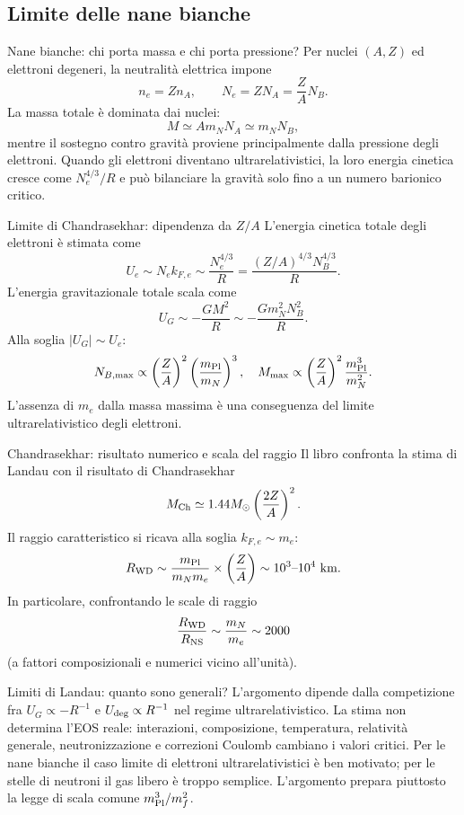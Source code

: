 \subsection{Limite delle nane bianche}

\begin{frame}[t]{Nane bianche: chi porta massa e chi porta pressione?}
\small
Per nuclei $(A,Z)$ ed elettroni degeneri, la neutralità elettrica impone
\[
n_e=Zn_A,\qquad N_e=ZN_A=\frac ZA N_B.
\]
La massa totale è dominata dai nuclei:
\[
M\simeq A m_N N_A\simeq m_NN_B,
\]
mentre il sostegno contro gravità proviene principalmente dalla pressione degli elettroni.
\medskip
Quando gli elettroni diventano ultrarelativistici, la loro energia cinetica cresce come $N_e^{4/3}/R$ e può bilanciare la gravità solo fino a un numero barionico critico.
\end{frame}

\begin{frame}[t]{Limite di Chandrasekhar: dipendenza da $Z/A$}
\small
L'energia cinetica totale degli elettroni è stimata come
\[
U_e\sim N_e k_{F,e}\sim\frac{N_e^{4/3}}R
=\frac{(Z/A)^{4/3}N_B^{4/3}}R.
\]
L'energia gravitazionale totale scala come
\[
U_G\sim-\frac{GM^2}R\sim-\frac{Gm_N^2N_B^2}R.
\]
Alla soglia $|U_G|\sim U_e$:
\[
N_{B,\max}\propto\left(\frac ZA\right)^2
\left(\frac{m_{\rm Pl}}{m_N}\right)^3,
\quad M_{\max}\propto\left(\frac ZA\right)^2\frac{m_{\rm Pl}^3}{m_N^2}.
\]
L'assenza di $m_e$ dalla massa massima è una conseguenza del limite ultrarelativistico degli elettroni.
\end{frame}

\begin{frame}[t]{Chandrasekhar: risultato numerico e scala del raggio}
\small
Il libro confronta la stima di Landau con il risultato di Chandrasekhar
\[
M_{\rm Ch}\simeq1.44M_\odot\left(\frac{2Z}{A}\right)^2.
\]
Il raggio caratteristico si ricava alla soglia $k_{F,e}\sim m_e$:
\[
R_{\rm WD}\sim\frac{m_{\rm Pl}}{m_Nm_e}
\times\left(\frac ZA\right)
\sim10^3\text{--}10^4\ \mathrm{km}.
\]
In particolare, confrontando le scale di raggio
\[
\frac{R_{\rm WD}}{R_{\rm NS}}\sim\frac{m_N}{m_e}\sim2000
\]
(a fattori composizionali e numerici vicino all'unità).
\end{frame}

\begin{frame}[t]{Limiti di Landau: quanto sono generali?}
\small
L'argomento dipende dalla competizione fra $U_G\propto-R^{-1}$ e $U_{\rm deg}\propto R^{-1}$ nel regime ultrarelativistico.
\medskip
La stima non determina l'EOS reale: interazioni, composizione, temperatura, relatività generale, neutronizzazione e correzioni Coulomb cambiano i valori critici.
\medskip
Per le nane bianche il caso limite di elettroni ultrarelativistici è ben motivato; per le stelle di neutroni il gas libero è troppo semplice. L'argomento prepara piuttosto la legge di scala comune $m_{\rm Pl}^3/m_f^2$.
\end{frame}


